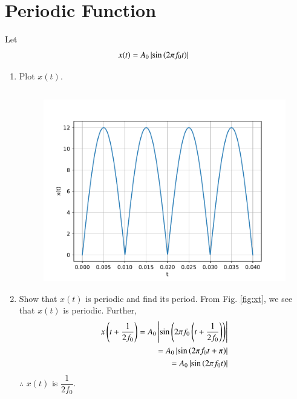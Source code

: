 \documentclass[journal,12pt,twocolumn]{IEEEtran}
\renewcommand\thesection{\arabic{section}}
\begin{document}
\section{Periodic Function}
Let 
\begin{align}
	x(t) &= A_0\left\vert\sin\left(2\pi f_0 t\right)\right\vert
	\label{eq:10-orig-diff-def}
\end{align}
\begin{enumerate}[label=\thesection.\arabic*
,ref=\thesection.\theenumi]
\item Plot $x(t)$.
\solution
\begin{lstlisting}

\end{lstlisting}

\begin{figure}[!ht]
	\begin{center}
		\includegraphics[width=\columnwidth]{./figs/e1.1.pdf}
	\end{center}
	\label{fig:}	
\end{figure}
\item Show that $x(t)$ is periodic and find its period.
\solution From Fig. \eqref{fig:xt}, we see that $x(t)$ is periodic. Further,
\begin{align}
	x\left(t+\frac{1}{2f_0}\right) = A_0\left\vert\sin\left(2\pi f_0\left(t + \frac{1}{2f_0}\right)\right)\right\vert \\
	= A_0\left\vert\sin\left(2\pi f_0t + \pi\right)\right\vert \\
	= A_0\left\vert\sin\left(2\pi f_0t\right)\right\vert
\end{align}
$\therefore$ $x(t)$ is $\dfrac{1}{2f_0}$.

\end{enumerate}
\end{document}

